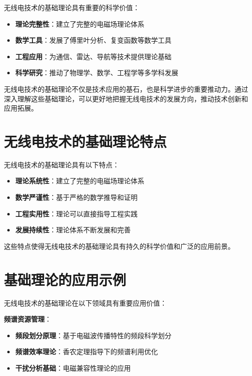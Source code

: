 \documentclass[12pt,UTF8]{ctexbook}
\begin{document}
无线电技术的基础理论具有重要的科学价值：

\begin{itemize}[leftmargin=3.5em]
    \item \textbf{理论完整性}：建立了完整的电磁场理论体系
    \item \textbf{数学工具}：发展了傅里叶分析、复变函数等数学工具
    \item \textbf{工程应用}：为通信、雷达、导航等技术提供理论基础
    \item \textbf{科学研究}：推动了物理学、数学、工程学等多学科发展
\end{itemize}

无线电技术的基础理论不仅是技术应用的基石，也是科学进步的重要推动力。通过深入理解这些基础理论，可以更好地把握无线电技术的发展方向，推动技术创新和应用拓展。

\section{无线电技术的基础理论特点}

无线电技术的基础理论具有以下特点：

\begin{itemize}[leftmargin=3.5em]
    \item \textbf{理论系统性}：建立了完整的电磁场理论体系
    \item \textbf{数学严谨性}：基于严格的数学推导和证明
    \item \textbf{工程实用性}：理论可以直接指导工程实践
    \item \textbf{发展持续性}：理论体系不断发展和完善
\end{itemize}

这些特点使得无线电技术的基础理论具有持久的科学价值和广泛的应用前景。

\section{基础理论的应用示例}

无线电技术的基础理论在以下领域具有重要应用价值：

\textbf{频谱资源管理}：
\begin{itemize}[leftmargin=3.5em]
    \item \textbf{频段划分原理}：基于电磁波传播特性的频段科学划分
    \item \textbf{频谱效率理论}：香农定理指导下的频谱利用优化
    \item \textbf{干扰分析基础}：电磁兼容性理论的应用
\end{itemize}
\end{document}
